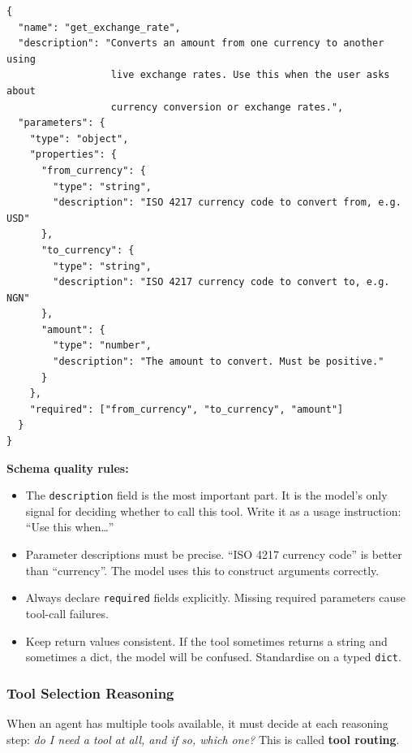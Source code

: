 \documentclass[12pt, a4paper]{article}
\newcommand{\kterm}[1]{\textbf{\textcolor{keyterm}{#1}}}
\begin{document}
\begin{theorybox}
\begin{lstlisting}[style=jsonstyle, caption={JSON schema generated from a Python function}]
{
  "name": "get_exchange_rate",
  "description": "Converts an amount from one currency to another using
                  live exchange rates. Use this when the user asks about
                  currency conversion or exchange rates.",
  "parameters": {
    "type": "object",
    "properties": {
      "from_currency": {
        "type": "string",
        "description": "ISO 4217 currency code to convert from, e.g. USD"
      },
      "to_currency": {
        "type": "string",
        "description": "ISO 4217 currency code to convert to, e.g. NGN"
      },
      "amount": {
        "type": "number",
        "description": "The amount to convert. Must be positive."
      }
    },
    "required": ["from_currency", "to_currency", "amount"]
  }
}
\end{lstlisting}

\medskip

\noindent\textbf{Schema quality rules:}

\begin{itemize}[leftmargin=*, itemsep=2pt]
  \item The \texttt{description} field is the most important part. It is the model's only signal for deciding whether to call this tool. Write it as a usage instruction: ``Use this when\ldots''
  \item Parameter descriptions must be precise. ``ISO 4217 currency code'' is better than ``currency''. The model uses this to construct arguments correctly.
  \item Always declare \texttt{required} fields explicitly. Missing required parameters cause tool-call failures.
  \item Keep return values consistent. If the tool sometimes returns a string and sometimes a dict, the model will be confused. Standardise on a typed \texttt{dict}.
\end{itemize}

\subsubsection*{Tool Selection Reasoning}

When an agent has multiple tools available, it must decide at each reasoning step: \emph{do I need a tool at all, and if so, which one?} This is called \kterm{tool routing}.


\end{theorybox}
\end{document}
